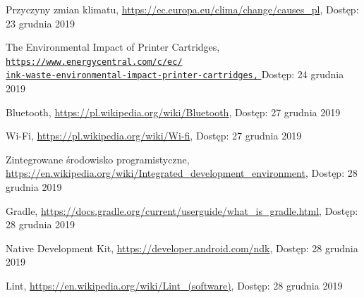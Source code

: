 \documentclass[a4paper,12pt, twoside]{article}
\begin{document}
 	\begingroup
	\renewcommand{\section}[2]{}
	\begin{thebibliography}{}
		
		Przyczyny zmian klimatu,
		\newline\url{https://ec.europa.eu/clima/change/causes\_pl}, 
		\newline Dostęp: 23 grudnia 2019
		
		The Environmental Impact of Printer Cartridges,
		\newline\href{https://www.energycentral.com/c/ec/ink-waste-environmental-impact-printer-cartridges}
		 {\nolinkurl{https://www.energycentral.com/c/ec/}
             \\
              \nolinkurl{ink-waste-environmental-impact-printer-cartridges,}
             }
		\newline Dostęp: 24 grudnia 2019
		
		Bluetooth,
		\newline\url{https://pl.wikipedia.org/wiki/Bluetooth}, 
		\newline Dostęp: 27 grudnia 2019
			
		Wi-Fi,
		\newline\url{https://pl.wikipedia.org/wiki/Wi-fi}, 
		\newline Dostęp: 27 grudnia 2019
		
		Zintegrowane środowisko programistyczne,
		\newline\url{https://en.wikipedia.org/wiki/Integrated_development_environment}, 
		\newline Dostęp: 28 grudnia 2019
		
		Gradle,
		\newline\url{https://docs.gradle.org/current/userguide/what_is_gradle.html}, 
		\newline Dostęp: 28 grudnia 2019
		
		Native Development Kit,
		\newline\url{https://developer.android.com/ndk}, 
		\newline Dostęp: 28 grudnia 2019
		
		Lint,
		\newline\url{https://en.wikipedia.org/wiki/Lint_(software)}, 
		\newline Dostęp: 28 grudnia 2019
		

\end{thebibliography}
\end{document}
